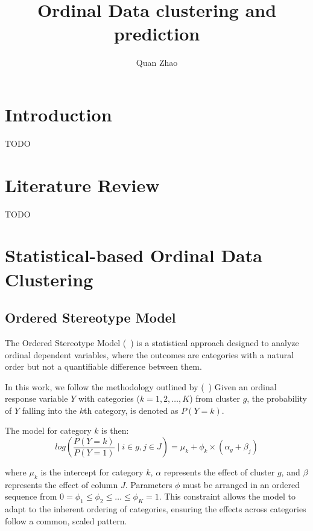 \documentclass{article}
\begin{document}
\title{Ordinal Data clustering and prediction}

\author{Quan Zhao}

\maketitle

\section{Introduction}

TODO


\section{Literature Review}

TODO

\section{Statistical-based Ordinal Data Clustering}

\subsection{Ordered Stereotype Model}

The Ordered Stereotype Model  (~\cite{anderson1984regression}) is a statistical approach designed to analyze ordinal dependent variables, where the outcomes are categories with a natural order but not a quantifiable difference between them.

In this work, we follow the methodology outlined by (~\cite{fernandez2016mixture})
Given an ordinal response variable $Y$ with categories ($k=1, 2, \ldots, K$) from cluster $g$, the probability of $Y$ falling into the $k$th category, is denoted as $P(Y = k)$.


The model for category $k$ is then:
\begin{equation}
log\left(\frac{P(Y = k)}{P(Y = 1)} \mid i \in g, j \in J\right) = \mu_k + \phi_k \times \left(\alpha_g + \beta_j\right) 
\end{equation}

where $\mu_k$ is the intercept for category $k$, 
 $\alpha$ represents the effect of cluster $g$,
and $\beta$ represents the effect of column $J$.
Parameters $\phi$ must be arranged in an ordered sequence from 
$0 = \phi_1 \leq \phi_2 \leq \ldots \leq \phi_K = 1.$ 
This constraint allows the model to adapt to the inherent ordering of categories, ensuring the effects across categories follow a common, scaled pattern.
\end{document}
